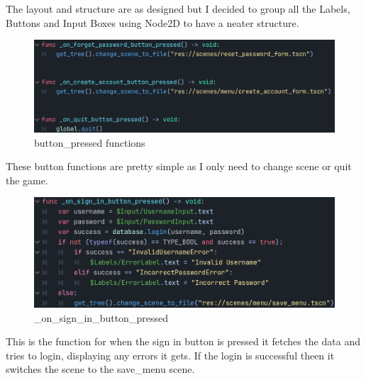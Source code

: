 \documentclass{article}
\begin{document}
        The layout and structure are as designed but I decided to group all the Labels, Buttons and Input Boxes using Node2D to have a neater structure.\\
        \begin{figure}[H]
              \centering
              \includegraphics{images/development/LoginForm_buttons.PNG}  
              \caption{button\_pressed functions}
        \end{figure}
        These button functions are pretty simple as I only need to change scene or quit the game.\\
        \begin{figure}[H]
                \centering
                \includegraphics{images/development/_on_sign_in_button_pressed.PNG}
                \caption{\_on\_sign\_in\_button\_pressed}
        \end{figure}
        \[\]
        This is the function for when the sign in button is pressed it fetches the data and tries to login, displaying any errors it gets. If the login is successful theen it switches the scene to the save\_menu scene.\\
\end{document}
